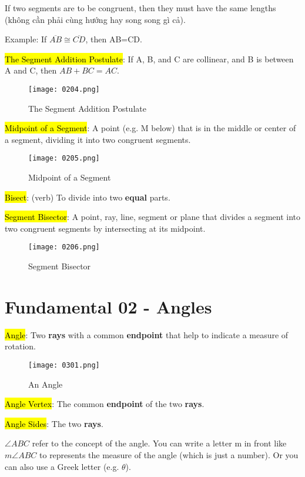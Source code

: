 If two segments are to be congruent, then they must have the same lengths (không cần phải cùng hướng hay song song gì cả).

Example: If $\overline{AB} \cong \overline{CD}$, then AB=CD.

\hl{The Segment Addition Postulate}: If A, B, and C are collinear, and B is between A and C, then $AB + BC = AC$.

\begin{figure}[h]
  \centering
  \texttt{[image: 0204.png]}
  \caption{The Segment Addition Postulate}
\end{figure}

\hl{Midpoint of a Segment}: A point (e.g. M below) that is in the middle or center of a segment, dividing it into two congruent segments.

\begin{figure}[h]
  \centering
  \texttt{[image: 0205.png]}
  \caption{Midpoint of a Segment}
\end{figure}

\hl{Bisect}: (verb) To divide into two \textbf{equal} parts.

\hl{Segment Bisector}: A point, ray, line, segment or plane that divides a segment into two congruent segments by intersecting at its midpoint.

\begin{figure}[htb!]
  \centering
  \texttt{[image: 0206.png]}
  \caption{Segment Bisector}
\end{figure}

\section{Fundamental 02 - Angles}

\hl{Angle}: Two \textbf{rays} with a common \textbf{endpoint} that help to indicate a measure of rotation.

\begin{figure}[htb!]
  \centering
  \texttt{[image: 0301.png]}
  \caption{An Angle}
\end{figure}

\hl{Angle Vertex}: The common \textbf{endpoint} of the two \textbf{rays}.

\hl{Angle Sides}: The two \textbf{rays}.

$\angle ABC$ refer to the concept of the angle. You can write a letter m in front like $m\angle ABC$ to represents the measure of the angle (which is just a number). Or you can also use a Greek letter (e.g. $\theta$).

